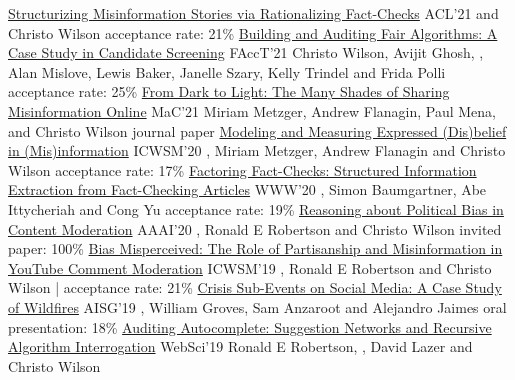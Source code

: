 \documentclass[letterpaper]{awesome-cv}
\begin{document}
\addvspace{0ex}
\begin{cventries}
  \cvpub
    {\href{https://shanjiang.me/publications/acl21_paper.pdf}{Structurizing Misinformation Stories via Rationalizing Fact-Checks}}
    {ACL'21}
    { and Christo Wilson}
    {acceptance rate: 21\%}
  \cvpubspecialtwo
    {\href{https://shanjiang.me/publications/facct21_paper.pdf}{Building and Auditing Fair Algorithms: A Case Study in Candidate Screening}}
    {FAccT'21}
    {Christo Wilson, Avijit Ghosh, , Alan Mislove, Lewis Baker, Janelle Szary, Kelly Trindel and Frida Polli}
    {acceptance rate: 25\%}
  \cvpub
    {\href{https://shanjiang.me/publications/mac21_paper.pdf}{From Dark to Light: The Many Shades of Sharing Misinformation Online}}
    {MaC'21}
    {Miriam Metzger, Andrew Flanagin, Paul Mena,  and Christo Wilson}
    {journal paper}
  \cvpub
    {\href{https://shanjiang.me/publications/icwsm20_paper.pdf}{Modeling and Measuring Expressed (Dis)belief in (Mis)information}}
    {ICWSM'20}
    {, Miriam Metzger, Andrew Flanagin and Christo Wilson}
    {acceptance rate: 17\%}
  \cvpub
    {\href{https://shanjiang.me/publications/www20_paper.pdf}{Factoring Fact-Checks: Structured Information Extraction from Fact-Checking Articles}}
    {WWW'20}
    {, Simon Baumgartner, Abe Ittycheriah and Cong Yu}
    {acceptance rate: 19\%}
  \cvpub
    {\href{https://shanjiang.me/publications/aaai20_paper.pdf}{Reasoning about Political Bias in Content Moderation}}
    {AAAI'20}
    {, Ronald E Robertson and Christo Wilson}
    {invited paper: 100\%}
  \cvpubspecial
    {\href{https://shanjiang.me/publications/icwsm19_paper.pdf}{Bias Misperceived: The Role of Partisanship and Misinformation in YouTube Comment Moderation}}
    {ICWSM'19}
    {, Ronald E Robertson and Christo Wilson}
    {  | acceptance rate: 21\%}
  \cvpub
    {\href{https://shanjiang.me/publications/aisg19_paper.pdf}{Crisis Sub-Events on Social Media: A Case Study of Wildfires}}
    {AISG'19}
    {, William Groves, Sam Anzaroot and Alejandro Jaimes}
    {oral presentation: 18\%}
  \cvpub
    {\href{https://shanjiang.me/publications/websci19_paper.pdf}{Auditing Autocomplete: Suggestion Networks and Recursive Algorithm Interrogation}}
    {WebSci'19}
    {Ronald E Robertson, , David Lazer and Christo Wilson}

\end{cventries}
\end{document}
